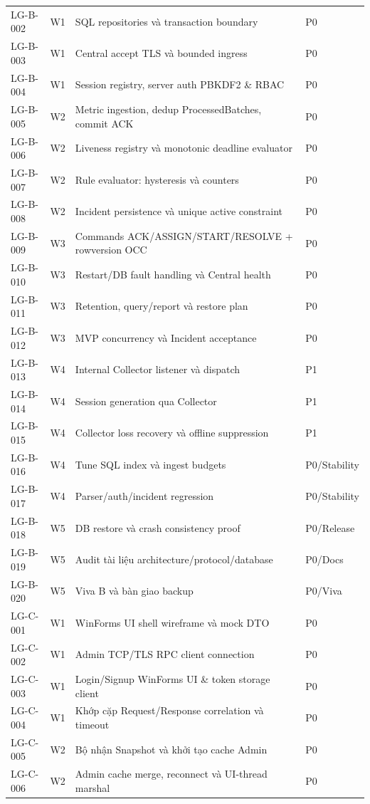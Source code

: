 \begin{longtable}{p{1.5cm} p{0.9cm} p{10.5cm} p{1.6cm}}
LG-B-002 & W1 & SQL repositories và transaction boundary & P0 \\
LG-B-003 & W1 & Central accept TLS và bounded ingress & P0 \\
LG-B-004 & W1 & Session registry, server auth PBKDF2 \& RBAC & P0 \\
LG-B-005 & W2 & Metric ingestion, dedup ProcessedBatches, commit ACK & P0 \\
LG-B-006 & W2 & Liveness registry và monotonic deadline evaluator & P0 \\
LG-B-007 & W2 & Rule evaluator: hysteresis và counters & P0 \\
LG-B-008 & W2 & Incident persistence và unique active constraint & P0 \\
LG-B-009 & W3 & Commands ACK/ASSIGN/START/RESOLVE + rowversion OCC & P0 \\
LG-B-010 & W3 & Restart/DB fault handling và Central health & P0 \\
LG-B-011 & W3 & Retention, query/report và restore plan & P0 \\
LG-B-012 & W3 & MVP concurrency và Incident acceptance & P0 \\
LG-B-013 & W4 & Internal Collector listener và dispatch & P1 \\
LG-B-014 & W4 & Session generation qua Collector & P1 \\
LG-B-015 & W4 & Collector loss recovery và offline suppression & P1 \\
LG-B-016 & W4 & Tune SQL index và ingest budgets & P0/Stability \\
LG-B-017 & W4 & Parser/auth/incident regression & P0/Stability \\
LG-B-018 & W5 & DB restore và crash consistency proof & P0/Release \\
LG-B-019 & W5 & Audit tài liệu architecture/protocol/database & P0/Docs \\
LG-B-020 & W5 & Viva B và bàn giao backup & P0/Viva \\
\midrule
LG-C-001 & W1 & WinForms UI shell wireframe và mock DTO & P0 \\
LG-C-002 & W1 & Admin TCP/TLS RPC client connection & P0 \\
LG-C-003 & W1 & Login/Signup WinForms UI \& token storage client & P0 \\
LG-C-004 & W1 & Khớp cặp Request/Response correlation và timeout & P0 \\
LG-C-005 & W2 & Bộ nhận Snapshot và khởi tạo cache Admin & P0 \\
LG-C-006 & W2 & Admin cache merge, reconnect và UI-thread marshal & P0 \\

\end{longtable}

